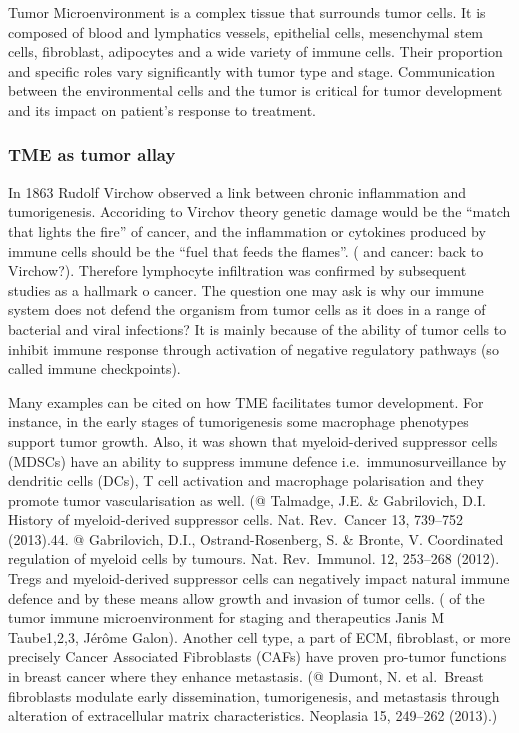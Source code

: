 \documentclass[12pt,]{book}
\theoremstyle{definition}
\theoremstyle{definition}
\theoremstyle{definition}
\theoremstyle{remark}
\begin{document}
Tumor Microenvironment is a complex tissue that surrounds tumor cells.
It is composed of blood and lymphatics vessels, epithelial cells,
mesenchymal stem cells, fibroblast, adipocytes and a wide variety of
immune cells. Their proportion and specific roles vary significantly
with tumor type and stage. Communication between the environmental cells
and the tumor is critical for tumor development and its impact on
patient's response to treatment.

\hypertarget{tme-as-tumor-allay}{%
\subsubsection{TME as tumor allay}\label{tme-as-tumor-allay}}

In 1863 Rudolf Virchow observed a link between chronic inflammation and
tumorigenesis. Accoriding to Virchov theory genetic damage would be the
``match that lights the fire'' of cancer, and the inflammation or
cytokines produced by immune cells should be the ``fuel that feeds the
flames''. (\citet{Inflammation} and cancer: back to Virchow?). Therefore
lymphocyte infiltration was confirmed by subsequent studies as a
hallmark o cancer. The question one may ask is why our immune system
does not defend the organism from tumor cells as it does in a range of
bacterial and viral infections? It is mainly because of the ability of
tumor cells to inhibit immune response through activation of negative
regulatory pathways (so called immune checkpoints).

Many examples can be cited on how TME facilitates tumor development. For
instance, in the early stages of tumorigenesis some macrophage
phenotypes support tumor growth. Also, it was shown that myeloid-derived
suppressor cells (MDSCs) have an ability to suppress immune defence
i.e.~immunosurveillance by dendritic cells (DCs), T cell activation and
macrophage polarisation and they promote tumor vascularisation as well.
(@ Talmadge, J.E. \& Gabrilovich, D.I. History of myeloid-derived
suppressor cells. Nat. Rev.~Cancer 13, 739--752 (2013).44. @
Gabrilovich, D.I., Ostrand-Rosenberg, S. \& Bronte, V. Coordinated
regulation of myeloid cells by tumours. Nat. Rev.~Immunol. 12, 253--268
(2012). Tregs and myeloid-derived suppressor cells can negatively impact
natural immune defence and by these means allow growth and invasion of
tumor cells. (\citet{Implications} of the tumor immune microenvironment
for staging and therapeutics Janis M Taube1,2,3, Jérôme Galon). Another
cell type, a part of ECM, fibroblast, or more precisely Cancer
Associated Fibroblasts (CAFs) have proven pro-tumor functions in breast
cancer where they enhance metastasis. (@ Dumont, N. et al.~Breast
fibroblasts modulate early dissemination, tumorigenesis, and metastasis
through alteration of extracellular matrix characteristics. Neoplasia
15, 249--262 (2013).)
\end{document}
